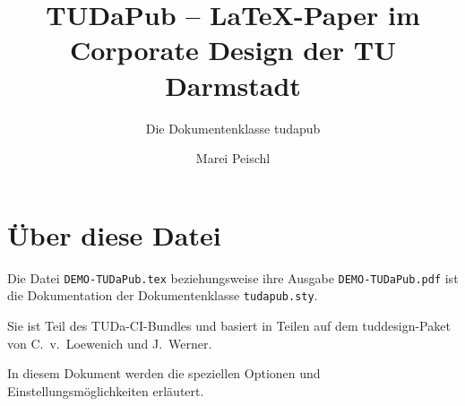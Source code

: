 \documentclass[
	ngerman,
	accentcolor=9c,%
	type=intern,
	marginpar=false
	]{tudapub}
\let\file\texttt
\begin{document}
	
	
\title{\texorpdfstring{TUDaPub -- \LaTeX-Paper im Corporate Design der TU Darmstadt}{TUDaPub -- LaTeX-Paper im Corporate Design der TU Darmstadt}}
\subtitle{Die Dokumentenklasse tudapub}
\author{Marei Peischl}

\maketitle

\tableofcontents

\section{Über diese Datei}
Die Datei \file{DEMO-TUDaPub.tex} beziehungsweise ihre Ausgabe \file{DEMO-TUDaPub.pdf} ist die Dokumentation der Dokumentenklasse \file{tudapub.sty}.

Sie ist Teil des TUDa-CI-Bundles und basiert in Teilen auf dem tuddesign-Paket von C.~v.~Loewenich und J.~Werner. 
	
In diesem Dokument werden die speziellen Optionen und Einstellungsmöglichkeiten erläutert.
\end{document}
